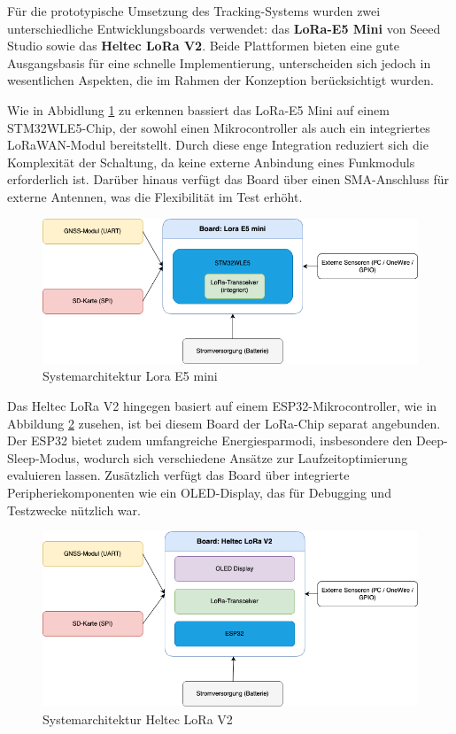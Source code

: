 Für die prototypische Umsetzung des Tracking-Systems wurden zwei unterschiedliche Entwicklungsboards verwendet: das \textbf{LoRa-E5 Mini} von Seeed Studio sowie das \textbf{Heltec LoRa V2}. Beide Plattformen bieten eine gute Ausgangsbasis für eine schnelle Implementierung, unterscheiden sich jedoch in wesentlichen Aspekten, die im Rahmen der Konzeption berücksichtigt wurden.

Wie in Abbidlung \ref{fig:systemarchtektur-lora-e5-mini} zu erkennen bassiert das LoRa-E5 Mini auf einem STM32WLE5-Chip, der sowohl einen Mikrocontroller als auch ein integriertes LoRaWAN-Modul bereitstellt. Durch diese enge Integration reduziert sich die Komplexität der Schaltung, da keine externe Anbindung eines Funkmoduls erforderlich ist. Darüber hinaus verfügt das Board über einen SMA-Anschluss für externe Antennen, was die Flexibilität im Test erhöht. 

\begin{figure}[H]
\centering
\includegraphics[scale=.5]{figures/diagrams/Architekturdiagramm_LoraE5mini.png}
\caption{Systemarchitektur Lora E5 mini}
\label{fig:systemarchtektur-lora-e5-mini}
\end{figure}

Das Heltec LoRa V2 hingegen basiert auf einem ESP32-Mikrocontroller, wie in Abbildung \ref{fig:systemarchtektur-heltec-lora-v2} zusehen, ist bei diesem Board der LoRa-Chip separat angebunden. Der ESP32 bietet zudem umfangreiche Energiesparmodi, insbesondere den Deep-Sleep-Modus, wodurch sich verschiedene Ansätze zur Laufzeitoptimierung evaluieren lassen. Zusätzlich verfügt das Board über integrierte Peripheriekomponenten wie ein OLED-Display, das für Debugging und Testzwecke nützlich war. 

\begin{figure}[H]
\centering
\includegraphics[scale=.5]{figures/diagrams/Architekturdiagramm_ESP32.png}
\caption{Systemarchitektur Heltec LoRa V2}
\label{fig:systemarchtektur-heltec-lora-v2}
\end{figure}

